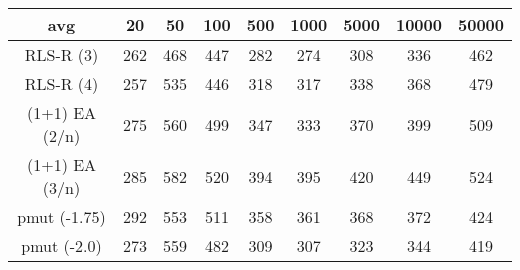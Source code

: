 \begin{tabular}[h]{ccccccccc}
avg&20&50&100&500&1000&5000&10000&50000\\\hline
RLS-R (3)&262&468&447&282&274&308&336&462\\
RLS-R (4)&257&535&446&318&317&338&368&479\\
(1+1) EA (2/n)&275&560&499&347&333&370&399&509\\
(1+1) EA (3/n)&285&582&520&394&395&420&449&524\\
pmut (-1.75)&292&553&511&358&361&368&372&424\\
pmut (-2.0)&273&559&482&309&307&323&344&419\\
\end{tabular}
